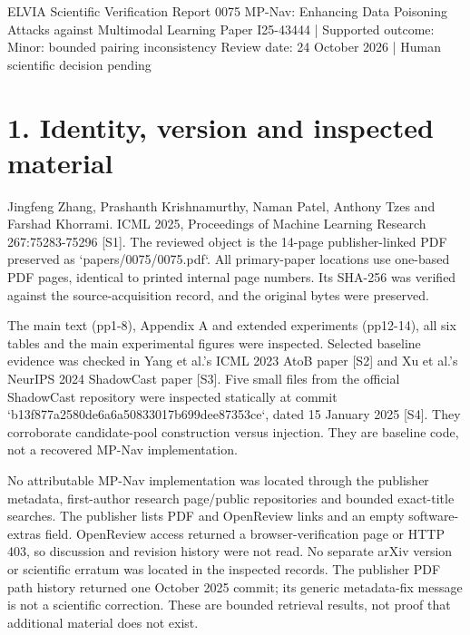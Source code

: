 \documentclass[10pt]{article}
\begin{document}
ELVIA Scientific Verification Report 0075
MP-Nav: Enhancing Data Poisoning Attacks against Multimodal Learning
Paper I25-43444 | Supported outcome: Minor: bounded pairing inconsistency
Review date: 24 October 2026 | Human scientific decision pending\par
\section*{1. Identity, version and inspected material}
Jingfeng Zhang, Prashanth Krishnamurthy, Naman Patel, Anthony Tzes and Farshad Khorrami. ICML 2025, Proceedings of Machine Learning Research 267:75283-75296 [S1]. The reviewed object is the 14-page publisher-linked PDF preserved as `papers/0075/0075.pdf`. All primary-paper locations use one-based PDF pages, identical to printed internal page numbers. Its SHA-256 was verified against the source-acquisition record, and the original bytes were preserved.\par
The main text (pp1-8), Appendix A and extended experiments (pp12-14), all six tables and the main experimental figures were inspected. Selected baseline evidence was checked in Yang et al.’s ICML 2023 AtoB paper [S2] and Xu et al.’s NeurIPS 2024 ShadowCast paper [S3]. Five small files from the official ShadowCast repository were inspected statically at commit `b13f877a2580de6a6a50833017b699dee87353ce`, dated 15 January 2025 [S4]. They corroborate candidate-pool construction versus injection. They are baseline code, not a recovered MP-Nav implementation.\par
No attributable MP-Nav implementation was located through the publisher metadata, first-author research page/public repositories and bounded exact-title searches. The publisher lists PDF and OpenReview links and an empty software-extras field. OpenReview access returned a browser-verification page or HTTP 403, so discussion and revision history were not read. No separate arXiv version or scientific erratum was located in the inspected records. The publisher PDF path history returned one October 2025 commit; its generic metadata-fix message is not a scientific correction. These are bounded retrieval results, not proof that additional material does not exist.\par
\end{document}
